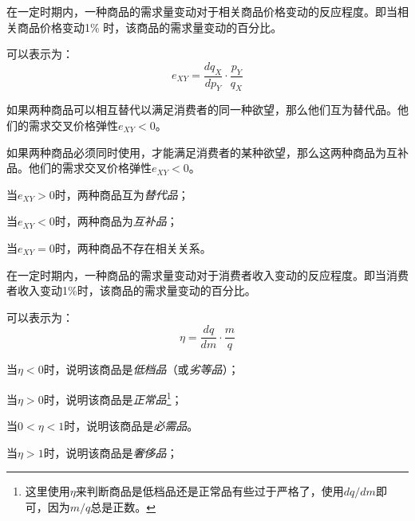\begin{Definition}[需求的交叉价格弹性]
在一定时期内，一种商品的需求量变动对于相关商品价格变动的反应程度。即当相关商品价格变动1\% 时，该商品的需求量变动的百分比。
\end{Definition}
可以表示为：
\begin{equation}
	e_{XY} = \frac{dq_X}{dp_Y} \cdot \frac{p_Y}{q_X}
\end{equation}

\begin{Definition}[替代品]
如果两种商品可以相互替代以满足消费者的同一种欲望，那么他们互为替代品。他们的需求交叉价格弹性$e_{XY}<0$。
\end{Definition}

\begin{Definition}[互补品]
如果两种商品必须同时使用，才能满足消费者的某种欲望，那么这两种商品为互补品。他们的需求交叉价格弹性$e_{XY}<0$。
\end{Definition}

\begin{compactitem}
\item 当$e_{XY}>0$时，两种商品互为\emph{替代品}；
\item 当$e_{XY}<0$时，两种商品为\emph{互补品}；
\item 当$e_{XY}=0$时，两种商品不存在相关关系。
\end{compactitem}

\begin{Definition}[需求的收入弹性]
在一定时期内，一种商品的需求量变动对于消费者收入变动的反应程度。即当消费者收入变动1\%时，该商品的需求量变动的百分比。
\end{Definition}
可以表示为：
	\begin{equation}\label{dfn:eofincome}
		\eta = \frac{{dq}}{{dm}}\cdot\frac{m}{q}
	\end{equation}

\begin{compactitem}
\item 当$\eta<0$时，说明该商品是\emph{低档品}（或\emph{劣等品}）；
\item 当$\eta>0$时，说明该商品是\emph{正常品}\footnote{%
这里使用$\eta$来判断商品是低档品还是正常品有些过于严格了，使用$dq/dm$即可，因为$m/q$总是正数。}；
\item 当$0<\eta<1$时，说明该商品是\emph{必需品}。
\item 当$\eta>1$时，说明该商品是\emph{奢侈品}；
\end{compactitem}

